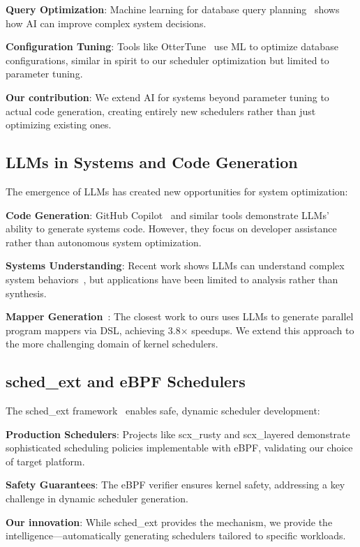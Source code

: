 \textbf{Query Optimization}: Machine learning for database query planning~\cite{marcus2019neo} shows how AI can improve complex system decisions.

\textbf{Configuration Tuning}: Tools like OtterTune~\cite{vanaken2017ottertune} use ML to optimize database configurations, similar in spirit to our scheduler optimization but limited to parameter tuning.

\textbf{Our contribution}: We extend AI for systems beyond parameter tuning to actual code generation, creating entirely new schedulers rather than just optimizing existing ones.

\subsection{LLMs in Systems and Code Generation}

The emergence of LLMs has created new opportunities for system optimization:

\textbf{Code Generation}: GitHub Copilot~\cite{chen2021codex} and similar tools demonstrate LLMs' ability to generate systems code. However, they focus on developer assistance rather than autonomous system optimization.

\textbf{Systems Understanding}: Recent work shows LLMs can understand complex system behaviors~\cite{wang2024llmsys}, but applications have been limited to analysis rather than synthesis.

\textbf{Mapper Generation}~\cite{wei2024mapper}: The closest work to ours uses LLMs to generate parallel program mappers via DSL, achieving 3.8× speedups. We extend this approach to the more challenging domain of kernel schedulers.

\subsection{sched\_ext and eBPF Schedulers}

The sched\_ext framework~\cite{schedext2024} enables safe, dynamic scheduler development:

\textbf{Production Schedulers}: Projects like scx\_rusty and scx\_layered demonstrate sophisticated scheduling policies implementable with eBPF, validating our choice of target platform.

\textbf{Safety Guarantees}: The eBPF verifier ensures kernel safety, addressing a key challenge in dynamic scheduler generation.

\textbf{Our innovation}: While sched\_ext provides the mechanism, we provide the intelligence—automatically generating schedulers tailored to specific workloads.

